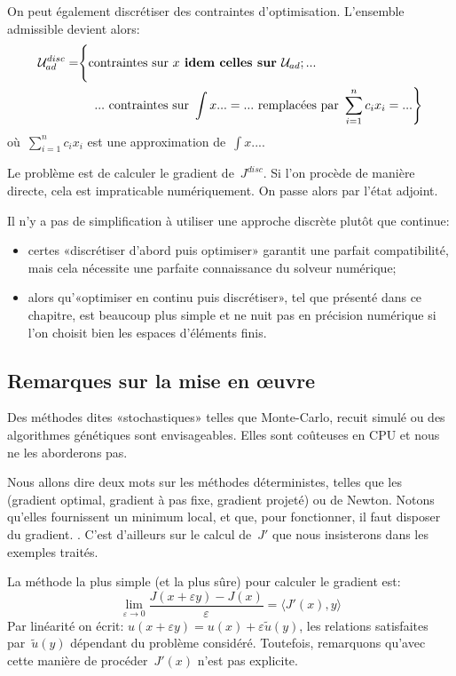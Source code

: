 On peut également discrétiser des contraintes d'optimisation. L'ensemble admissible devient alors:
\begin{equation}
\begin{split} 
\mathcal{U}^{disc}_{ad} = &\Bigg\{ \text{contraintes sur } x \textbf{ idem celles sur } \mathcal{U}_{ad}; ...\\  
& \left. \quad ... \text{ contraintes sur } \int x...=... \text{ remplacées par } \displaystyle\sum_{i=1}^n c_ix_i = ... \right\}
\end{split}
\end{equation}
où~$\sum_{i=1}^n c_ix_i$ est une approximation de~$\int x...$.

Le problème est de calculer le gradient de~$J^{disc}$. Si l'on procède de manière directe, cela est impraticable numériquement. On passe alors par l'état adjoint.

\medskip
Il n'y a pas de simplification à utiliser une approche discrète plutôt que continue:
\begin{itemize}
   \item certes «discrétiser d'abord puis optimiser» garantit une parfait compatibilité, mais cela nécessite une parfaite connaissance du solveur numérique;
   \item alors qu'«optimiser en continu puis discrétiser», tel que présenté dans ce chapitre, est beaucoup plus simple et ne nuit pas en précision numérique si l'on choisit bien les espaces d'éléments finis.
\end{itemize}


\medskip
\subsection{Remarques sur la mise en œuvre}

Des méthodes dites «stochastiques» telles que Monte-Carlo, recuit simulé ou des algorithmes génétiques sont envisageables. Elles sont coûteuses en CPU et nous ne les aborderons pas.

Nous allons dire deux mots sur les méthodes déterministes, telles que les  (gradient optimal, gradient à pas fixe, gradient projeté) ou de Newton. Notons qu'elles fournissent un minimum local, et que, pour fonctionner, il faut disposer du gradient. . C'est d'ailleurs sur le calcul de~$J'$ que nous insisterons dans les exemples traités.

\medskip
La méthode la plus simple (et la plus sûre) pour calculer le gradient est:
\begin{equation}
\lim_{\varepsilon\rightarrow0} \dfrac{J(x+\varepsilon y)-J(x)}{\varepsilon}
=\langle J'(x),y\rangle %
\end{equation}
Par linéarité on écrit: $u(x+\varepsilon y)=u(x)+\varepsilon \tilde{u}(y)$, les relations satisfaites par~$\tilde{u}(y)$ dépendant du problème considéré.
Toutefois, remarquons qu'avec cette manière de procéder~$J'(x)$ n'est pas explicite.

